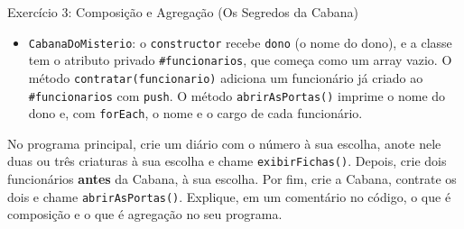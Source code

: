 \begin{exercicio}{Exercício 3: Composição e Agregação (Os Segredos da Cabana)}
\begin{itemize}
    \item \texttt{CabanaDoMisterio}: o \texttt{constructor} recebe \texttt{dono} (o nome do
    dono), e a classe tem o atributo privado \texttt{\#funcionarios}, que começa como um array
    vazio. O método \texttt{contratar(funcionario)} adiciona um funcionário já criado ao
    \texttt{\#funcionarios} com \texttt{push}. O método \texttt{abrirAsPortas()} imprime o nome
    do dono e, com \texttt{forEach}, o nome e o cargo de cada funcionário.
\end{itemize}

No programa principal, crie um diário com o número à sua escolha, anote nele duas ou três
criaturas à sua escolha e chame \texttt{exibirFichas()}. Depois, crie dois funcionários
\textbf{antes} da Cabana, à sua escolha. Por fim, crie a Cabana, contrate os dois e chame
\texttt{abrirAsPortas()}. Explique, em um comentário no código, o que é composição e o que é
agregação no seu programa.
\end{exercicio}

